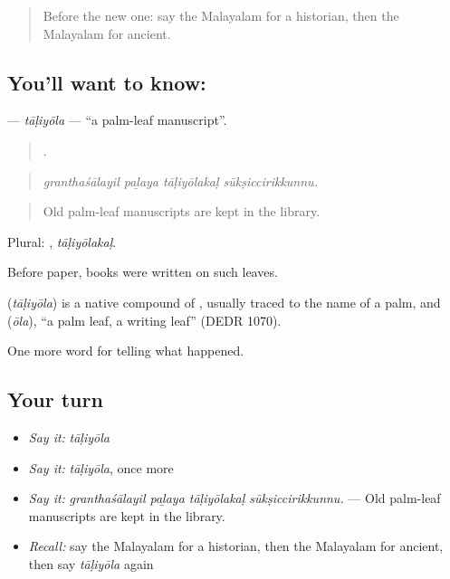 \label{lesson:ML-C404-taliyola}



\begin{quote}
Before the new one: say the Malayalam for a historian, then the Malayalam for ancient.
\end{quote}

\subsection*{You'll want to know: }
\textbf{} — \emph{tāḷiyōla} — \textquotedblleft{}a palm-leaf manuscript\textquotedblright{}.

\begin{quote}
   .
\end{quote}

\begin{quote}
\emph{granthaśālayil paḻaya tāḷiyōlakaḷ sūkṣiccirikkunnu.}
\end{quote}

\begin{quote}
Old palm-leaf manuscripts are kept in the library.
\end{quote}

Plural: , \emph{tāḷiyōlakaḷ}.

Before paper, books were written on such leaves.

\begin{cousinweb}
\textbf{} (\emph{tāḷiyōla}) is a native compound of , usually traced to the name of a palm, and  (\emph{ōla}), \textquotedblleft{}a palm leaf, a writing leaf\textquotedblright{} (DEDR 1070).
\end{cousinweb}

\begin{grammarlens}[title={What you've built}]
One more word for telling what happened.
\end{grammarlens}

\subsection*{Your turn}
\begin{itemize}
\raggedright
  \item \emph{Say it:} \emph{tāḷiyōla}
  \item \emph{Say it:} \emph{tāḷiyōla}, once more
  \item \emph{Say it:} \emph{granthaśālayil paḻaya tāḷiyōlakaḷ sūkṣiccirikkunnu.} — Old palm-leaf manuscripts are kept in the library.
  \item \emph{Recall:} say the Malayalam for a historian, then the Malayalam for ancient, then say \emph{tāḷiyōla} again
\end{itemize}

